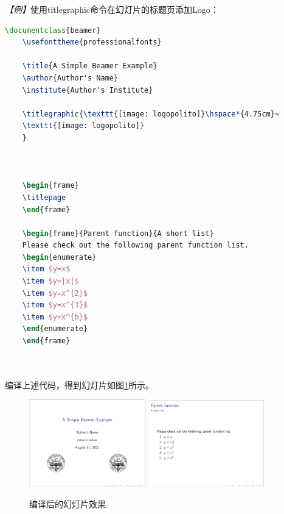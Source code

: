 \emph{【例】}使用titlegraphic命令在幻灯片的标题页添加Logo：
\begin{lstlisting}[language=TeX]
    \documentclass{beamer}
    \usefonttheme{professionalfonts}

    \title{A Simple Beamer Example}
    \author{Author's Name}
    \institute{Author's Institute}

    \titlegraphic{\texttt{[image: logopolito]}\hspace*{4.75cm}~
    \texttt{[image: logopolito]}
    }

    

    \begin{frame}
    \titlepage
    \end{frame}

    \begin{frame}{Parent function}{A short list}
    Please check out the following parent function list.
    \begin{enumerate}
    \item $y=x$
    \item $y=|x|$
    \item $y=x^{2}$
    \item $y=x^{3}$
    \item $y=x^{b}$
    \end{enumerate}
    \end{frame}

    
\end{lstlisting}

编译上述代码，得到幻灯片如图\ref{figeg:011}所示。

\begin{figure}[htbp]
    \centering
    \includegraphics[width = 0.45\textwidth]{images/ch_9/example_sec2_8_0.png}
    \includegraphics[width = 0.45\textwidth]{images/ch_9/example_sec2_8_1.png}
    \caption{编译后的幻灯片效果}
    \label{figeg:011}
\end{figure}